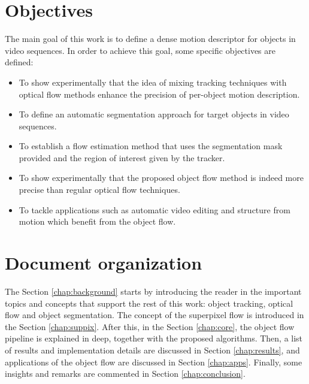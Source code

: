 \section{Objectives}

The main goal of this work is to define a dense motion descriptor for objects in video sequences. 
In order to achieve this goal, some specific objectives are defined:

\begin{itemize}

  \item To show experimentally that the idea of mixing tracking techniques with optical flow methods enhance the precision of per-object motion description.
  \item To define an automatic segmentation approach for target objects in video sequences.
  \item To establish a flow estimation method that uses the segmentation mask provided and the region of interest given by the tracker.
  \item To show experimentally that the proposed object flow method is indeed more precise than regular optical flow techniques.
  \item To tackle applications such as automatic video editing and structure from motion which benefit from the object flow.
\end{itemize}

\section{Document organization}

The Section \ref{chap:background} starts by introducing the reader in the important topics and concepts that support the rest of this work: 
object tracking, optical flow and object segmentation. 
The concept of the superpixel flow is introduced in the Section \ref{chap:suppix}.
After this, in the Section \ref{chap:core}, the object flow pipeline is explained in deep, 
together with the proposed algorithms. 
Then, a list of results and implementation details are discussed in Section \ref{chap:results}, and 
 applications of the object flow are discussed in Section
\ref{chap:apps}. Finally, some insights and remarks are commented in Section \ref{chap:conclusion}.


